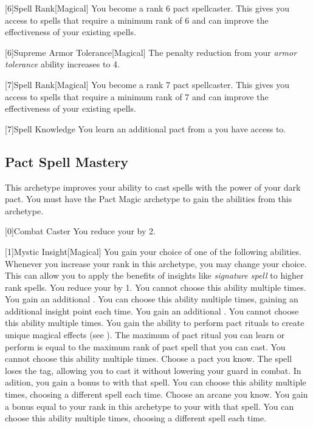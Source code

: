         [6]{Spell Rank}[Magical] You become a rank 6 pact spellcaster.
        This gives you access to spells that require a minimum rank of 6 and can improve the effectiveness of your existing spells.

        [6]{Supreme Armor Tolerance}[Magical] The penalty reduction from your \textit{armor tolerance} ability increases to 4.

        [7]{Spell Rank}[Magical] You become a rank 7 pact spellcaster.
        This gives you access to spells that require a minimum rank of 7 and can improve the effectiveness of your existing spells.

        [7]{Spell Knowledge} You learn an additional pact  from a  you have access to.

    \newpage
    \subsection{Pact Spell Mastery}
        This archetype improves your ability to cast spells with the power of your dark pact.
        You must have the Pact Magic archetype to gain the abilities from this archetype.

        [0]{Combat Caster} You reduce your  by 2.

        [1]{Mystic Insight}[Magical]
        You gain your choice of one of the following abilities.
        Whenever you increase your rank in this archetype, you may change your choice.
        This can allow you to apply the benefits of insights like \textit{signature spell} to higher rank spells.
        {
             You reduce your  by 1.
                You cannot choose this ability multiple times.
             You gain an additional .
                You can choose this ability multiple times, gaining an additional insight point each time.
             You gain an additional .
                You cannot choose this ability multiple times.
             You gain the ability to perform pact rituals to create unique magical effects (see ).
                The maximum  of pact ritual you can learn or perform is equal to the maximum rank of pact spell that you can cast.
                You cannot choose this ability multiple times.
             Choose a pact  you know.
                The spell loses the  tag, allowing you to cast it without lowering your guard in combat.
                In adition, you gain a  bonus to  with that spell.
                You can choose this ability multiple times, choosing a different spell each time.
             Choose an arcane  you know.
                You gain a bonus equal to your rank in this archetype to your  with that spell.
                You can choose this ability multiple times, choosing a different spell each time.
        }


